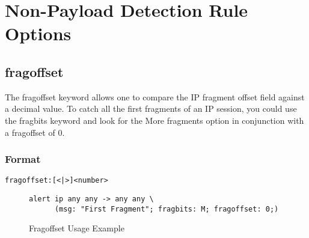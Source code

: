 \documentclass[english]{report}
\begin{document}
%
%
%
%


\section{Non-Payload Detection Rule Options}
\subsection{fragoffset \label{fragoffset section}}

The fragoffset keyword allows one to compare the IP fragment offset
field against a decimal value. To catch all the first fragments of
an IP session, you could use the fragbits keyword and look for the
More fragments option in conjunction with a fragoffset of 0.


\subsubsection{Format}

\begin{verbatim}
fragoffset:[<|>]<number>
\end{verbatim}

\begin{figure}[!hbpt]
\begin{verbatim}
alert ip any any -> any any \
      (msg: "First Fragment"; fragbits: M; fragoffset: 0;)
\end{verbatim}
\caption{Fragoffset Usage Example \label{fragoffset usage example}}
\end{figure}
\end{document}
